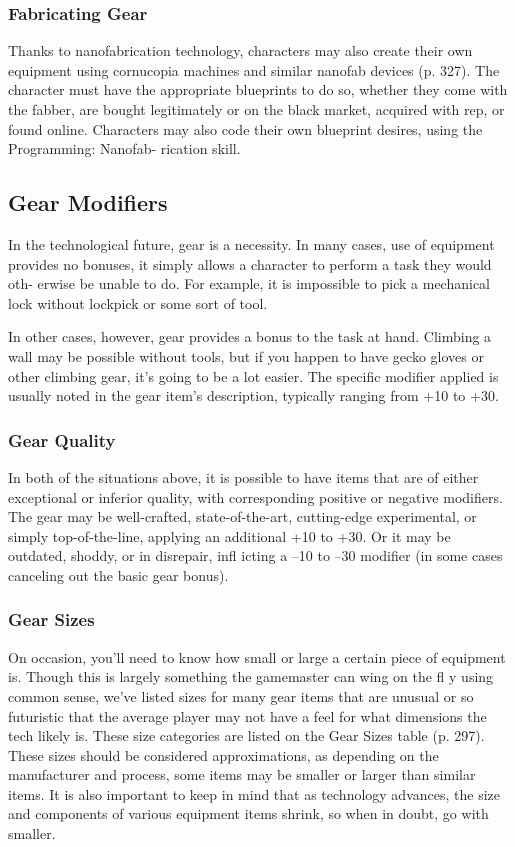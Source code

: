 \subsubsection{Fabricating Gear}

Thanks to nanofabrication technology, characters may 
also create their own equipment using cornucopia 
machines and similar nanofab devices (p. 327). The 
character must have the appropriate blueprints to do 
so, whether they come with the fabber, are bought 
legitimately or on the black market, acquired with rep, 
or found online. Characters may also code their own 
blueprint desires, using the Programming: Nanofab-
rication skill.

\subsection{Gear Modifiers}

In the technological future, gear is a necessity. In many 
cases, use of equipment provides no bonuses, it simply 
allows a character to perform a task they would oth-
erwise be unable to do. For example, it is impossible 
to pick a mechanical lock without lockpick or some 
sort of tool.

In other cases, however, gear provides a bonus to 
the task at hand. Climbing a wall may be possible 
without tools, but if you happen to have gecko gloves 
or other climbing gear, it's going to be a lot easier. The 
specific modifier applied is usually noted in the gear 
item's description, typically ranging from +10 to +30.

\subsubsection{Gear Quality}

In both of the situations above, it is possible to have 
items that are of either exceptional or inferior quality, 
with corresponding positive or negative modifiers. The 
gear may be well-crafted, state-of-the-art, cutting-edge 
experimental, or simply top-of-the-line, applying an 
additional +10 to +30. Or it may be outdated, shoddy, 
or in disrepair, infl icting a –10 to –30 modifier  (in 
some cases canceling out the basic gear bonus).

\subsubsection{Gear Sizes}

On occasion, you'll need to know how small or large 
a certain piece of equipment is. Though this is largely 
something the gamemaster can wing on the fl y using 
common sense, we've listed sizes for many gear items 
that are unusual or so futuristic that the average player 
may not have a feel for what dimensions the tech 
likely is. These size categories are listed on the Gear 
Sizes table (p. 297). These sizes should be considered 
approximations, as depending on the manufacturer 
and process, some items may be smaller or larger than 
similar items. It is also important to keep in mind that 
as technology advances, the size and components of 
various equipment items shrink, so when in doubt, go 
with smaller.

